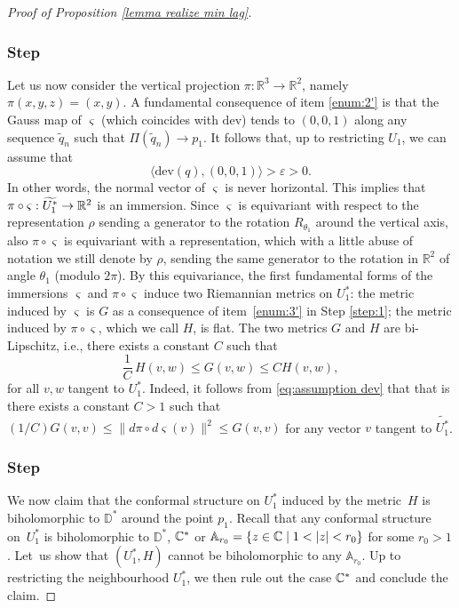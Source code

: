 \documentclass[11pt]{article}
\newcommand{\ie}{i.e.,\xspace}
\let\epsilon\varepsilon
\newcounter{steps}
\newcommand{\step}{\refstepcounter{steps}\subsubsection*{Step \thesteps}}
\theoremstyle{definition}
\newcommand{\R}{{\mathbb R}}
\newcommand{\dev}{\mathrm{dev}}
\begin{document}
\begin{proof}[Proof of Proposition \ref{lemma realize min lag}]
\step\label{step:4}
Let us now consider the vertical projection $\pi:\R^3\to\R^2$, namely $\pi(x,y,z)=(x,y)$.
A fundamental consequence of item \eqref{enum:2'} is that the Gauss map of $\varsigma$ (which coincides with $\dev$) tends to $(0,0,1)$ along any sequence $\widetilde q_n$ such that $\Pi(\widetilde q_n)\to p_1$. It follows that, up to restricting $U_1$, we can assume that
\begin{equation}\label{eq:assumption dev}
\langle\dev(q),(0,0,1)\rangle>\epsilon> 0.
\end{equation}
In other words, the normal vector of $\varsigma$ is never horizontal.
This implies that $\pi\circ\varsigma:\widetilde{U_1^*}\to\nobreak\R^2$ is an immersion. Since $\varsigma$ is equivariant with respect to the representation $\rho$ sending a generator to the rotation $R_{\theta_1}$ around the vertical axis, also $\pi\circ\varsigma$ is equivariant with a representation, which with a little abuse of notation we still denote by $\rho$, sending the same generator to the rotation in $\R^2$ of angle $\theta_1$ (modulo $2\pi$). By this equivariance, the first fundamental forms of the immersions $\varsigma$ and $\pi\circ\varsigma$ induce two Riemannian metrics on $U_1^*$: the metric induced by $\varsigma$ is $G$ as a consequence of item~\eqref{enum:3'} in Step \ref{step:1}; the metric induced by $\pi\circ\varsigma$, which we call $H$, is flat. The two metrics $G$ and $H$ are bi-Lipschitz, \ie there exists a constant $C$ such that
\begin{equation}\label{eq:assumption bilip}
\frac{1}{C}\,H(v,w)\leq G(v,w)\leq CH(v,w),
\end{equation}
for all $v,w$ tangent to $U_1^*$. Indeed, it follows from \eqref{eq:assumption dev} that that is there exists a constant $C>1$ such that
$({1}/{C}){G(v,v)}\leq \|d\pi\circ d\varsigma(v)\|^2\leq {G(v,v)}$
for any vector $v$ tangent to $\widetilde{U_1^*}$.

\step\label{step:5}
We now claim that the conformal structure on $U_1^*$ induced by the metric~$H$ is biholomorphic to $\mathbb D^*$ around the point $p_1$. Recall that any conformal structure on~$U_1^*$ is biholomorphic to $\mathbb D^*$, ${\mathbb C}^*$ or $\mathbb A_{r_0}=\{z\in\C\mid1<|z|<r_0\}$ for some $r_0>1$. Let~us show that $(U_1^*,H)$ cannot be biholomorphic to any $\mathbb A_{r_0}$. Up to restricting the neighbourhood $U_1^*$, we then rule out the case ${\mathbb C}^*$ and conclude the claim.


\end{proof}
\end{document}
